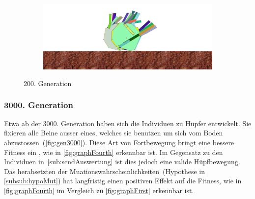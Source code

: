 \begin{figure}[H]
\begin{subfigure}[b]{0.45\textwidth}
                \includegraphics[width=\linewidth,center]{graphics/simulation-results/4_gen200_4}
                \caption{\label{fig:gen200_4}}
              \end{subfigure}
              \caption{200. Generation \label{fig:gen200}}
            \end{figure}


          \subsubsection{3000. Generation}
            Etwa ab der 3000. Generation haben sich die Individuen zu Hüpfer entwickelt.
            Sie fixieren alle Beine ausser eines, welches sie benutzen um sich vom Boden abzustossen~(\vref{fig:gen3000}).
            Diese Art von Fortbewegung bringt eine bessere Fitness ein , wie in \vref{fig:graphFourth} erkennbar ist.
            Im Gegensatz zu den Individuen in~\vref{sub:scndAuswertung} ist dies jedoch eine valide Hüpfbewegung.
            Das herabsetzten der Muationswahrscheinlichkeiten~(Hypothese in \vref{subsub:hypoMut}) hat langfristig einen positiven Effekt auf die Fitness,
            wie in \vref{fig:graphFourth} im Vergleich zu \vref{fig:graphFirst} erkennbar ist.

            \vspace{0.5cm}

